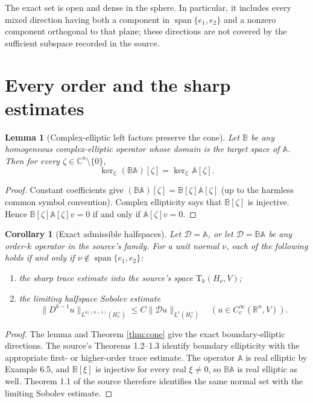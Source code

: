 \documentclass[11pt]{article}
\newtheorem{lemma}{Lemma}
\newtheorem{corollary}{Corollary}
\newcommand{\R}{\mathbb R}
\newcommand{\C}{\mathbb C}
\newcommand{\A}{\mathbb A}
\newcommand{\B}{\mathbb B}
\begin{document}
The exact set is open and dense in the sphere.  In particular, it includes
every mixed direction having both a component in
$\operatorname{span}\{e_1,e_2\}$ and a nonzero component orthogonal to
that plane; these directions are not covered by the sufficient subspace
recorded in the source.

\section{Every order and the sharp estimates}

\begin{lemma}[Complex-elliptic left factors preserve the cone]
Let $\B$ be any homogeneous complex-elliptic operator whose domain is the
target space of $\A$.  Then for every $\zeta\in\C^n\setminus\{0\}$,
\[
 \ker_{\C}(\B\A)[\zeta]=\ker_{\C}\A[\zeta].
\]
\end{lemma}

\begin{proof}
Constant coefficients give $(\B\A)[\zeta]=\B[\zeta]\A[\zeta]$ (up to
the harmless common symbol convention).  Complex ellipticity says that
$\B[\zeta]$ is injective.  Hence
$\B[\zeta]\A[\zeta]v=0$ if and only if $\A[\zeta]v=0$.
\end{proof}

\begin{corollary}[Exact admissible halfspaces]\label{cor:estimates}
Let $\mathcal D=\A$, or let $\mathcal D=\B\A$ be any order-$k$
operator in the source's family.  For a unit normal $\nu$, each of the
following holds if and only if
$\nu\notin\operatorname{span}\{e_1,e_2\}$:
\begin{enumerate}
 \item the sharp trace estimate into the source's space
       $\mathrm T_k(H_\nu,V)$;
 \item the limiting halfspace Sobolev estimate
 \[
  \|D^{k-1}u\|_{L^{n/(n-1)}(H_\nu^+)}
  \le C\|\mathcal D u\|_{L^1(H_\nu^+)}
  \quad(u\in C_c^\infty(\R^n,V)).
 \]
\end{enumerate}
\end{corollary}

\begin{proof}
The lemma and Theorem \ref{thm:cone} give the exact boundary-elliptic
directions.  The source's Theorems 1.2--1.3 identify boundary ellipticity
with the appropriate first- or higher-order trace estimate.  The operator
$\A$ is real elliptic by Example 6.5, and $\B[\xi]$ is injective for every
real $\xi\ne0$, so $\B\A$ is real elliptic as well.  Theorem 1.1 of the
source therefore identifies the same normal set with the limiting
Sobolev estimate.
\end{proof}
\end{document}
